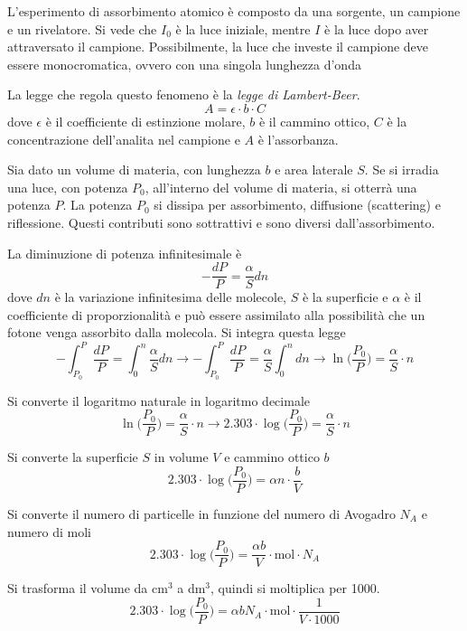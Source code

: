 L'esperimento di assorbimento atomico è composto da una sorgente, un campione e un rivelatore. Si vede che $I_0$ è la luce iniziale, mentre $I$ è la luce dopo aver attraversato il campione.
Possibilmente, la luce che investe il campione deve essere monocromatica, ovvero con una singola lunghezza d'onda

La legge che regola questo fenomeno è la \emph{legge di Lambert-Beer}.
\[
A = \epsilon \cdot b \cdot C
\]
dove $\epsilon$ è il coefficiente di estinzione molare, $b$ è il cammino ottico, $C$ è la concentrazione dell'analita nel campione e $A$ è l'assorbanza.

Sia dato un volume di materia, con lunghezza $b$ e area laterale $S$. Se si irradia una luce, con potenza $P_0$, all'interno del volume di materia, si otterrà una potenza $P$.
La potenza $P_0$ si dissipa per assorbimento, diffusione (scattering) e riflessione. Questi contributi sono sottrattivi e sono diversi dall'assorbimento.



La diminuzione di potenza infinitesimale è
\[
-\frac{dP}{P} = \frac{\alpha}{S} dn
\]
dove $dn$ è la variazione infinitesima delle molecole, $S$ è la superficie e $\alpha$ è il coefficiente di proporzionalità e può essere assimilato alla possibilità che un fotone venga assorbito dalla molecola.
Si integra questa legge
\[
-\int_{P_0}^P \frac{dP}{P} = \int_0^n \frac{\alpha}{S} dn \rightarrow -\int_{P_0}^P \frac{dP}{P} = \frac{\alpha}{S} \int_0^n dn  \rightarrow \ln \biggl(\frac{P_0}{P}\biggr) = \frac{\alpha}{S} \cdot n
\]

Si converte il logaritmo naturale in logaritmo decimale
\[
\ln \biggl(\frac{P_0}{P}\biggr) = \frac{\alpha}{S} \cdot n \rightarrow 2.303 \cdot \log \biggl(\frac{P_0}{P}\biggr) = \frac{\alpha}{S} \cdot n
\]

Si converte la superficie $S$ in volume $V$ e cammino ottico $b$
\[
2.303 \cdot \log \biggl(\frac{P_0}{P}\biggr) = \alpha n \cdot \frac{b}{V}
\]

Si converte il numero di particelle in funzione del numero di Avogadro $N_A$ e numero di moli
\[
2.303 \cdot \log \biggl(\frac{P_0}{P}\biggr) = \frac{\alpha b}{V} \cdot \text{mol} \cdot N_A
\]

Si trasforma il volume da cm$^3$ a dm$^3$, quindi si moltiplica per 1000.
\[
2.303 \cdot \log \biggl(\frac{P_0}{P}\biggr) = \alpha b N_A \cdot \text{mol} \cdot \frac{1}{V \cdot 1000}
\]

